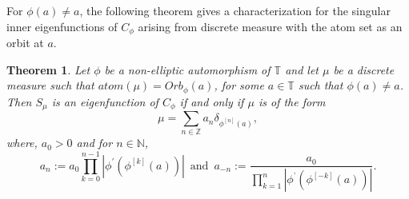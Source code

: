 \documentclass[12pt, reqno]{amsart}
\newtheorem{theorem}{Theorem}[section]
\theoremstyle{definition}
\numberwithin{equation}{section}
\begin{document}
For $\phi(a)\neq a$, the following theorem gives a characterization for the singular inner eigenfunctions of $C_\phi$ arising from discrete measure with the atom set as an orbit at $a$.

\begin{theorem}\label{disingular}
	Let $\phi$ be a non-elliptic automorphism of $\mathbb{T}$ and let $\mu$ be a discrete measure such that $atom(\mu)=Orb_{\phi}(a)$, for some $a \in \mathbb{T}$ such that $\phi(a)\neq a$. Then $S_\mu$ is an eigenfunction of $C_\phi$ if and only if  $\mu$ is of the form
	$$\mu=\sum\limits_{n \in \mathbb{Z}}a_n\delta_{\phi^{[n]}(a)},$$
	where, $a_0>0$  and for $n \in \mathbb{N}$, 
$$a_n:=a_0\prod\limits_{k=0}^{n-1}|\phi^{'}(\phi^{[k]}(a))|\, \text
{  and  }\, a_{-n}:=\dfrac{a_0}{\prod\limits_{k=1}^{n}|\phi^{’}(\phi^{[-k]}(a))|}.$$
\end{theorem}
\end{document}
